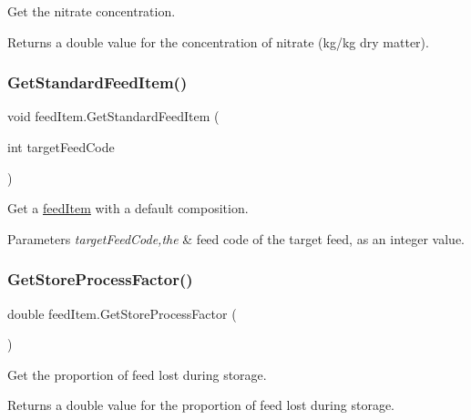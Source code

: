 Get the nitrate concentration. 

\begin{DoxyReturn}{Returns}
a double value for the concentration of nitrate (kg/kg dry matter). 
\end{DoxyReturn}
\mbox{\label{classfeed_item_aa72ab2d2d970e988b2f739e0abccf031}} 
\subsubsection{\texorpdfstring{GetStandardFeedItem()}{GetStandardFeedItem()}}
{\footnotesize\ttfamily void feed\+Item.\+Get\+Standard\+Feed\+Item (\begin{DoxyParamCaption}\item[{int}]{target\+Feed\+Code }\end{DoxyParamCaption})\hspace{0.3cm}{\ttfamily [inline]}}



Get a \mbox{\hyperlink{classfeed_item}{feed\+Item}} with a default composition. 


\begin{DoxyParams}{Parameters}
{\em target\+Feed\+Code,the} & feed code of the target feed, as an integer value. \\
\hline
\end{DoxyParams}
\mbox{\label{classfeed_item_a86efcd61f525edf159c12193e1cf4f91}} 
\subsubsection{\texorpdfstring{GetStoreProcessFactor()}{GetStoreProcessFactor()}}
{\footnotesize\ttfamily double feed\+Item.\+Get\+Store\+Process\+Factor (\begin{DoxyParamCaption}{ }\end{DoxyParamCaption})\hspace{0.3cm}{\ttfamily [inline]}}



Get the proportion of feed lost during storage. 

\begin{DoxyReturn}{Returns}
a double value for the proportion of feed lost during storage. 
\end{DoxyReturn}
\mbox{\label{classfeed_item_a6c014cb057ccf54655d47d29d10101c9}} 
